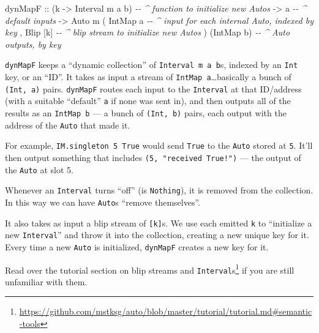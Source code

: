\documentclass[]{article}
\newenvironment{Shaded}{}{}
\newcommand{\CommentTok}[1]{\textcolor[rgb]{0.38,0.63,0.69}{\textit{#1}}}
\newcommand{\DataTypeTok}[1]{\textcolor[rgb]{0.56,0.13,0.00}{#1}}
\newcommand{\NormalTok}[1]{#1}
\newcommand{\OtherTok}[1]{\textcolor[rgb]{0.00,0.44,0.13}{#1}}
\renewcommand{\href}[2]{#2\footnote{\url{#1}}}
\begin{document}
\begin{Shaded}
\begin{Highlighting}[]
\OtherTok{dynMapF ::}\NormalTok{ (k }\OtherTok{{-}>} \DataTypeTok{Interval}\NormalTok{ m a b)    }\CommentTok{{-}{-} \^{} function to initialize new \textasciigrave{}Auto\textasciigrave{}s}
        \OtherTok{{-}>}\NormalTok{ a                        }\CommentTok{{-}{-} \^{} default inputs}
        \OtherTok{{-}>} \DataTypeTok{Auto}\NormalTok{ m ( }\DataTypeTok{IntMap}\NormalTok{ a        }\CommentTok{{-}{-} \^{} input for each internal \textasciigrave{}Auto\textasciigrave{}, indexed by key}
\NormalTok{                  , }\DataTypeTok{Blip}\NormalTok{ [k]        }\CommentTok{{-}{-} \^{} blip stream to initialize new \textasciigrave{}Auto\textasciigrave{}s}
\NormalTok{                  )}
\NormalTok{                  (}\DataTypeTok{IntMap}\NormalTok{ b)        }\CommentTok{{-}{-} \^{} \textasciigrave{}Auto\textasciigrave{} outputs, by key}
\end{Highlighting}
\end{Shaded}

\texttt{dynMapF} keeps a ``dynamic collection'' of \texttt{Interval\ m\ a\ b}s,
indexed by an \texttt{Int} key, or an ``ID''. It takes as input a stream of
\texttt{IntMap\ a}\ldots basically a bunch of \texttt{(Int,\ a)} pairs.
\texttt{dynMapF} routes each input to the \texttt{Interval} at that ID/address
(with a suitable ``default'' \texttt{a} if none was sent in), and then outputs
all of the results as an \texttt{IntMap\ b} --- a bunch of \texttt{(Int,\ b)}
pairs, each output with the address of the \texttt{Auto} that made it.

For example, \texttt{IM.singleton\ 5\ True} would send \texttt{True} to the
\texttt{Auto} stored at \texttt{5}. It'll then output something that includes
\texttt{(5,\ "received\ True!")} --- the output of the \texttt{Auto} at slot 5.

Whenever an \texttt{Interval} turns ``off'' (is \texttt{Nothing}), it is removed
from the collection. In this way we can have \texttt{Auto}s ``remove
themselves''.

It also takes as input a blip stream of \texttt{{[}k{]}}s. We use each emitted
\texttt{k} to ``initialize a new \texttt{Interval}'' and throw it into the
collection, creating a new unique key for it. Every time a new \texttt{Auto} is
initialized, \texttt{dynMapF} creates a new key for it.

Read over the
\href{https://github.com/mstksg/auto/blob/master/tutorial/tutorial.md\#semantic-tools}{tutorial
section on blip streams and \texttt{Interval}s} if you are still unfamiliar with
them.
\end{document}
